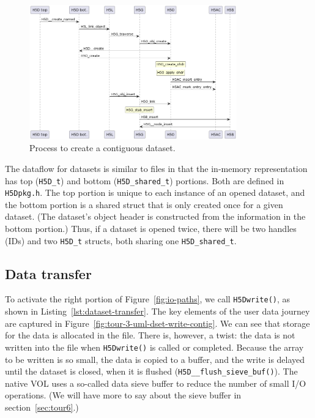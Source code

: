 \begin{figure}
    \centering
    \includegraphics[width=0.80\textwidth]{images/tour_3_uml_dset_create.png}
    \caption{Process to create a contiguous dataset.}
    \label{fig:tour-3-uml-dset-create-contig}
\end{figure}

The dataflow for datasets is similar to files in that the in-memory representation has top (\texttt{H5D\_t}) and bottom (\texttt{H5D\_shared\_t}) portions. Both are defined in \texttt{H5Dpkg.h}. The top portion is unique to each instance of an opened dataset, and the bottom portion is a shared struct that is only created once for a given dataset. (The dataset's object header is constructed from the information in the bottom portion.) Thus, if a dataset is opened twice, there will be two handles (IDs) and two \texttt{H5D\_t} structs, both sharing one \texttt{H5D\_shared\_t}.

\subsection{Data transfer}\label{sec:data-transfer}

To activate the right portion of Figure~\ref{fig:io-paths}, we call \texttt{H5Dwrite()}, as shown in Listing~\ref{lst:dataset-transfer}. The key elements of the user data journey are captured in Figure~\ref{fig:tour-3-uml-dset-write-contig}. We can see that storage for the data is allocated in the file. There is, however, a twist: the data is not written into the file when \texttt{H5Dwrite()} is called or completed. Because the array to be written is so small, the data is copied to a buffer, and the write is delayed until the dataset is closed, when it is flushed (\texttt{H5D\_\_flush\_sieve\_buf()}). The native VOL uses a so-called data sieve buffer to reduce the number of small I/O operations. (We will have more to say about the sieve buffer in section~\ref{sec:tour6}.)

